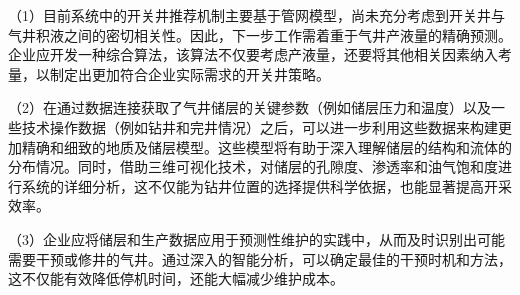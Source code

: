 （1）目前系统中的开关井推荐机制主要基于管网模型，尚未充分考虑到开关井与气井积液之间的密切相关性。因此，下一步工作需着重于气井产液量的精确预测。企业应开发一种综合算法，该算法不仅要考虑产液量，还要将其他相关因素纳入考量，以制定出更加符合企业实际需求的开关井策略。

（2）在通过数据连接获取了气井储层的关键参数（例如储层压力和温度）以及一些技术操作数据（例如钻井和完井情况）之后，可以进一步利用这些数据来构建更加精确和细致的地质及储层模型。这些模型将有助于深入理解储层的结构和流体的分布情况。同时，借助三维可视化技术，对储层的孔隙度、渗透率和油气饱和度进行系统的详细分析，这不仅能为钻井位置的选择提供科学依据，也能显著提高开采效率。

（3）企业应将储层和生产数据应用于预测性维护的实践中，从而及时识别出可能需要干预或修井的气井。通过深入的智能分析，可以确定最佳的干预时机和方法，这不仅能有效降低停机时间，还能大幅减少维护成本。